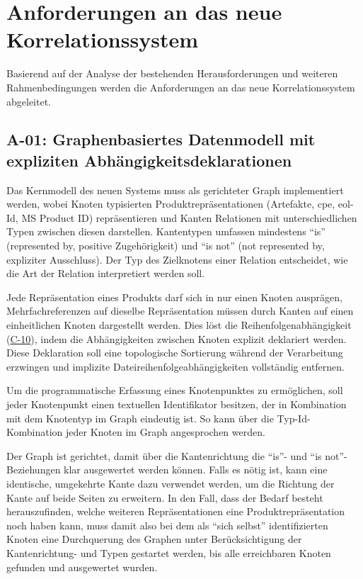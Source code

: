\section{Anforderungen an das neue Korrelationssystem}\label{sec:requirements}


Basierend auf der Analyse der bestehenden Herausforderungen und weiteren Rahmenbedingungen werden die Anforderungen an das neue Korrelationssystem abgeleitet.

\subsection{A-01: Graphenbasiertes Datenmodell mit expliziten Abhängigkeitsdeklarationen}\label{subsec:req-format-product-graph}

Das Kernmodell des neuen Systems muss als gerichteter Graph implementiert werden, wobei Knoten typisierten Produktrepräsentationen (Artefakte, \acrshort{cpe}, \acrshort{eol}-Id, MS Product ID) repräsentieren und Kanten Relationen mit unterschiedlichen Typen zwischen diesen darstellen.
Kantentypen umfassen mindestens \enquote{is} (represented by, positive Zugehörigkeit) und \enquote{is not} (not represented by, expliziter Ausschluss).
Der Typ des Zielknotens einer Relation entscheidet, wie die Art der Relation interpretiert werden soll.

Jede Repräsentation eines Produkts darf sich in nur einen Knoten ausprägen, Mehrfachreferenzen auf dieselbe Repräsentation müssen durch Kanten auf einen einheitlichen Knoten dargestellt werden.
Dies löst die Reihenfolgenabhängigkeit (\hyperref[subsec:c-10-order-dependency]{C-10}), indem die Abhängigkeiten zwischen Knoten explizit deklariert werden.
Diese Deklaration soll eine topologische Sortierung während der Verarbeitung erzwingen und implizite Dateireihenfolgeabhängigkeiten vollständig entfernen.

Um die programmatische Erfassung eines Knotenpunktes zu ermöglichen, soll jeder Knotenpunkt einen textuellen Identifikator besitzen, der in Kombination mit dem Knotentyp im Graph eindeutig ist.
So kann über die Typ-Id-Kombination jeder Knoten im Graph angesprochen werden.

Der Graph ist gerichtet, damit über die Kantenrichtung die \enquote{is}- und \enquote{is not}-Beziehungen klar ausgewertet werden können.
Falls es nötig ist, kann eine identische, umgekehrte Kante dazu verwendet werden, um die Richtung der Kante auf beide Seiten zu erweitern.
In den Fall, dass der Bedarf besteht herauszufinden, welche weiteren Repräsentationen eine Produktrepräsentation noch haben kann, muss damit also bei dem als \enquote{sich selbst} identifizierten Knoten eine Durchquerung des Graphen unter Berücksichtigung der Kantenrichtung- und Typen gestartet werden, bis alle erreichbaren Knoten gefunden und ausgewertet wurden.

